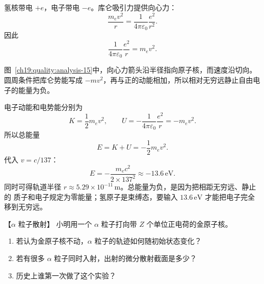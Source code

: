 \begin{xesolution}
氢核带电 $+e$，电子带电 $-e$。库仑吸引力提供向心力：
\[
  \frac{m_ev^2}{r}=\frac{1}{4\pi\varepsilon_0}\frac{e^2}{r^2}.
\]
因此
\[
  \frac{1}{4\pi\varepsilon_0}\frac{e^2}{r}=m_ev^2.
\]

\begin{qualityfigure}
\bohrAtomFigure
{}\label{ch19:quality:analysis-15}
\end{qualityfigure}
图~\ref{ch19:quality:analysis-15}中，向心力箭头沿半径指向原子核，而速度沿切向。圆周条件把库仑势能写成 $-mv^2$，再与正的动能相加，所以相对无穷远静止自由电子的能量为负。

电子动能和电势能分别为
\[
  K=\frac12m_ev^2,
  \qquad U=-\frac{1}{4\pi\varepsilon_0}\frac{e^2}{r}=-m_ev^2.
\]
所以总能量
\[
  E=K+U=-\frac12m_ev^2.
\]
代入 $v=c/137$：
\[
  \boxed{E=-\frac{m_ec^2}{2\times137^2}
  \approx-13.6\,\mathrm{eV}}.
\]
同时可得轨道半径 $r\approx5.29\times10^{-11}\,\mathrm m$。总能量为负，是因为把相距无穷远、静止的
质子和电子规定为零能量；氢原子是束缚态，要输入 $13.6\,\mathrm{eV}$ 才能把电子完全移到无穷远。
\end{xesolution}



\begin{origexamplebox}{【$\alpha$ 粒子散射】}\label{ch19:ex:s33-2-9}
小明用一个 $\alpha$ 粒子打向带 $Z$ 个单位正电荷的金原子核。
\begin{enumerate}[label=\arabic*.]
  \item 若认为金原子核不动，$\alpha$ 粒子的轨迹如何随初始状态变化？
  \item 若有很多 $\alpha$ 粒子同时入射，出射的微分散射截面是多少？
  \item 历史上谁第一次做了这个实验？
\end{enumerate}

\ThQRutherford
\end{origexamplebox}\par\nopagebreak[4]

